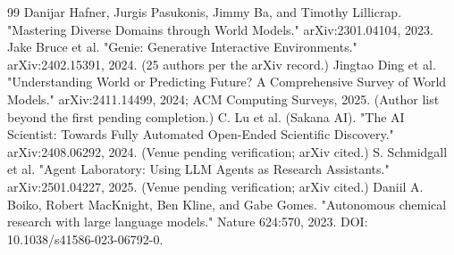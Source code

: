 \documentclass[11pt,a4paper]{article}
\begin{document}
\begin{thebibliography}{99}
 Danijar Hafner, Jurgis Pasukonis, Jimmy Ba, and Timothy Lillicrap. "Mastering Diverse Domains through World Models." arXiv:2301.04104, 2023.
 Jake Bruce et al. "Genie: Generative Interactive Environments." arXiv:2402.15391, 2024. (25 authors per the arXiv record.)
 Jingtao Ding et al. "Understanding World or Predicting Future? A Comprehensive Survey of World Models." arXiv:2411.14499, 2024; ACM Computing Surveys, 2025. (Author list beyond the first pending completion.)
 C. Lu et al. (Sakana AI). "The AI Scientist: Towards Fully Automated Open-Ended Scientific Discovery." arXiv:2408.06292, 2024. (Venue pending verification; arXiv cited.)
 S. Schmidgall et al. "Agent Laboratory: Using LLM Agents as Research Assistants." arXiv:2501.04227, 2025. (Venue pending verification; arXiv cited.)
 Daniil A. Boiko, Robert MacKnight, Ben Kline, and Gabe Gomes. "Autonomous chemical research with large language models." Nature 624:570, 2023. DOI: 10.1038/s41586-023-06792-0.
\end{thebibliography}
\end{document}
